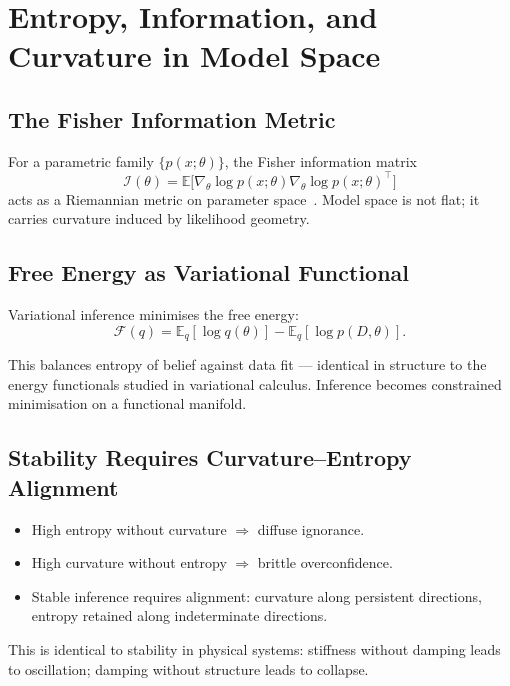 \documentclass[12pt,openany]{book}
\begin{document}
\chapter{Entropy, Information, and Curvature in Model Space}
\label{ch:entropy}

\section{The Fisher Information Metric}

For a parametric family $\{p(x;\theta)\}$, the Fisher information matrix
\[
  \mathcal{I}(\theta)
  = \mathbb{E}\bigl[\nabla_\theta\log p(x;\theta)
                    \nabla_\theta\log p(x;\theta)^\top\bigr]
\]
acts as a Riemannian metric on parameter space~\cite{amari}. Model space is
not flat; it carries curvature induced by likelihood geometry.

\section{Free Energy as Variational Functional}

Variational inference minimises the free energy:
\[
  \mathcal{F}(q)
  = \mathbb{E}_q[\log q(\theta)] - \mathbb{E}_q[\log p(D,\theta)].
\]

This balances entropy of belief against data fit — identical in structure to
the energy functionals studied in variational calculus. Inference becomes
constrained minimisation on a functional manifold.

\section{Stability Requires Curvature--Entropy Alignment}

\begin{itemize}[leftmargin=1.5em]
  \item High entropy without curvature $\Rightarrow$ diffuse ignorance.
  \item High curvature without entropy $\Rightarrow$ brittle overconfidence.
  \item Stable inference requires alignment: curvature along persistent
    directions, entropy retained along indeterminate directions.
\end{itemize}

This is identical to stability in physical systems: stiffness without damping
leads to oscillation; damping without structure leads to collapse.
\end{document}
